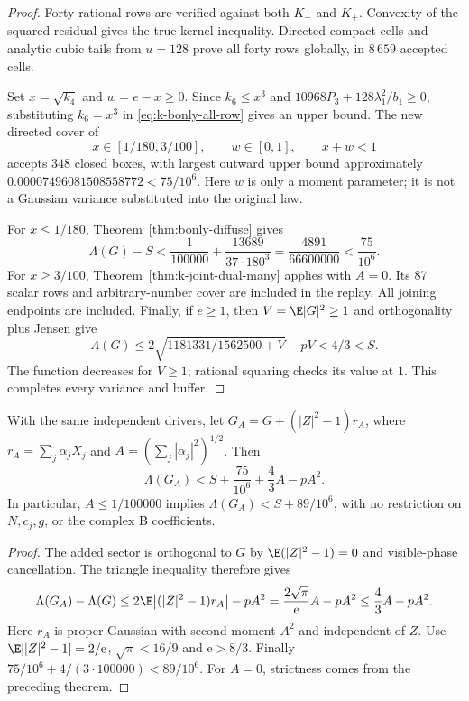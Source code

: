 \begin{proof}
Forty rational rows are verified against both $K_-$ and $K_+$.
Convexity of the squared residual gives the true-kernel inequality.
Directed compact cells and analytic cubic tails from $u=128$ prove
all forty rows globally, in $8\,659$ accepted cells.

Set $x=\sqrt{k_4}$ and $w=e-x\ge0$. Since $k_6\le x^3$ and
$10968P_3+128\lambda_1^2/b_1\ge0$, substituting $k_6=x^3$ in
\eqref{eq:k-bonly-all-row} gives an upper bound. The new directed cover of
\[
 x\in[1/180,3/100],\qquad w\in[0,1],\qquad x+w<1
\]
accepts $348$ closed boxes, with largest outward upper bound
approximately $0.00007496081508558772<75/10^6$.
Here $w$ is only a moment parameter; it is not a Gaussian variance
substituted into the original law.

For $x\le1/180$, Theorem~\ref{thm:bonly-diffuse} gives
\[
 \Lambda(G)-S<\frac1{100000}+\frac{13689}{37\cdot180^3}
 =\frac{4891}{66600000}<\frac{75}{10^6}.
\]
For $x\ge3/100$, Theorem~\ref{thm:k-joint-dual-many} applies with
$A=0$. Its 87 scalar rows and arbitrary-number cover are included
in the replay. All joining endpoints are included.
Finally, if $e\ge1$, then $V=\E|G|^2\ge1$ and orthogonality plus
Jensen give
\[
 \Lambda(G)\le2\sqrt{1181331/1562500+V}-pV<4/3<S.
\]
The function decreases for $V\ge1$; rational squaring checks its
value at $1$. This completes every variance and buffer.
\end{proof}

\begin{corollary}
With the same independent drivers, let
$G_A=G+(|Z|^2-1)r_A$, where $r_A=\sum_j\alpha_jX_j$ and
$A=(\sum_j|\alpha_j|^2)^{1/2}$. Then
\[
 \Lambda(G_A)<S+\frac{75}{10^6}+\frac43 A-pA^2.
\]
In particular, $A\le1/100000$ implies $\Lambda(G_A)<S+89/10^6$,
with no restriction on $N,c_j,g$, or the complex B coefficients.
\end{corollary}
\begin{proof}
The added sector is orthogonal to $G$ by $\E(|Z|^2-1)=0$ and
visible-phase cancellation. The triangle inequality therefore gives
\[
 \Lambda(G_A)-\Lambda(G)
 \le2\E\bigl|(|Z|^2-1)r_A\bigr|-pA^2
 =\frac{2\sqrt\pi}{\mathrm e}A-pA^2\le\frac43A-pA^2.
\]
Here $r_A$ is proper Gaussian with second moment $A^2$ and independent
of $Z$. Use $\E||Z|^2-1|=2/\mathrm e$,
$\sqrt\pi<16/9$ and $\mathrm e>8/3$. Finally
$75/10^6+4/(3\cdot100000)<89/10^6$.
For $A=0$, strictness comes from the preceding theorem.
\end{proof}

